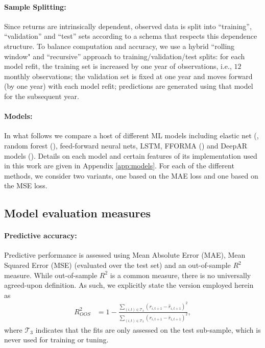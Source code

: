\documentclass{article}
\begin{document}
\paragraph{Sample Splitting:} Since returns are intrinsically dependent, observed data is split into ``training”, ``validation'' and ``test'' sets according to a schema that respects this dependence structure. To balance computation and accuracy, we use a  hybrid ``rolling window"  and ``recursive'' approach to training/validation/test splits: for each model refit, the training set is increased by one year of observations, i.e., $12$ monthly observations; the validation set is fixed at one year and moves forward (by one year) with each model refit; predictions are generated using that model for the subsequent year.


\paragraph{Models:} In what follows we compare a host of different ML models including elastic net (\cite{zou_regularization_2005}, random forest (\cite{breiman_random_2001}), feed-forward neural nets, LSTM, FFORMA (\cite{montero-manso_fforma_2020}) and DeepAR models (\cite{salinas_deepar_2019}). Details on each model and certain features of its implementation used in this work are given in Appendix \ref{app:models}. For each of the different methods, we consider two variants, one based on the MAE loss and one based on the MSE loss. 

\subsection{Model evaluation measures}
\paragraph{Predictive accuracy:}
Predictive performance is assessed using Mean Absolute Error (MAE), Mean Squared Error (MSE) (evaluated over the test set) and an out-of-sample $R^2$ measure. While  out-of-sample $R^2$ is a common measure, there is no universally agreed-upon definition. As such, we explicitly state the version employed herein as
\begin{align}
R^2_{OOS} &= 1 - \frac{\sum_{(i, t)\in\mathcal{T}_3}(r_{i, t+1} - \widehat{r}_{i, t+1})^2}
{\sum_{(i, t)\in\mathcal{T}_3} \left( r_{i, t+1} - \bar{r}_{i, t+1} \right) ^2},
\end{align}
where $\mathcal{T}_3$ indicates that the fits are only assessed on the test sub-sample, which is never used for training or tuning.
\end{document}
